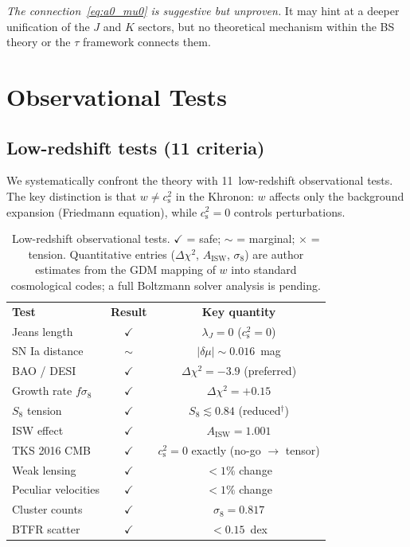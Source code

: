 \documentclass[prd,twocolumn,superscriptaddress,longbibliography,floatfix]{revtex4-2}
\newcommand{\tauasym}{\tau}
\newcommand{\cs}{c_{\mathrm{s}}}
\begin{document}
\emph{The connection~\eqref{eq:a0_mu0} is suggestive but
unproven.}  It may hint at a deeper unification of the $J$
and $K$ sectors, but no theoretical mechanism within the BS
theory or the $\tauasym$ framework connects them.


\section{Observational Tests}
\label{sec:tests}

\subsection{Low-redshift tests (11 criteria)}

We systematically confront the theory with 11~low-redshift
observational tests.  The key distinction is that
$w \neq \cs^2$ in the Khronon: $w$ affects
only the background expansion (Friedmann equation), while
$\cs^2 = 0$ controls perturbations.

\begin{table}[t]
\caption{\label{tab:tests}Low-redshift observational tests.
$\checkmark$ = safe; $\sim$ = marginal;
$\times$ = tension.  Quantitative entries ($\Delta\chi^2$,
$A_{\mathrm{ISW}}$, $\sigma_8$) are author estimates from the
GDM mapping of $w$ into standard cosmological codes;
a full Boltzmann solver analysis is pending.}
\begin{ruledtabular}
\begin{tabular}{lcc}
\textbf{Test} & \textbf{Result} & \textbf{Key quantity} \\
\colrule
Jeans length & $\checkmark$ & $\lambda_J = 0$ ($\cs^2 = 0$) \\
SN Ia distance & $\sim$ & $|\delta\mu| \sim 0.016$~mag \\
BAO / DESI & $\checkmark$ & $\Delta\chi^2 = -3.9$ (preferred) \\
Growth rate $f\sigma_8$ & $\checkmark$ & $\Delta\chi^2 = +0.15$ \\
$S_8$ tension & $\checkmark$ & $S_8 \lesssim 0.84$ (reduced$^{\dag}$) \\
ISW effect & $\checkmark$ & $A_{\mathrm{ISW}} = 1.001$ \\
TKS 2016 CMB & $\checkmark$ & $\cs^2 = 0$ exactly (no-go $\to$ tensor) \\
Weak lensing & $\checkmark$ & $< 1\%$ change \\
Peculiar velocities & $\checkmark$ & $< 1\%$ change \\
Cluster counts & $\checkmark$ & $\sigma_8 = 0.817$ \\
BTFR scatter & $\checkmark$ & $< 0.15$~dex \\
\end{tabular}
\end{ruledtabular}
\end{table}
\end{document}
